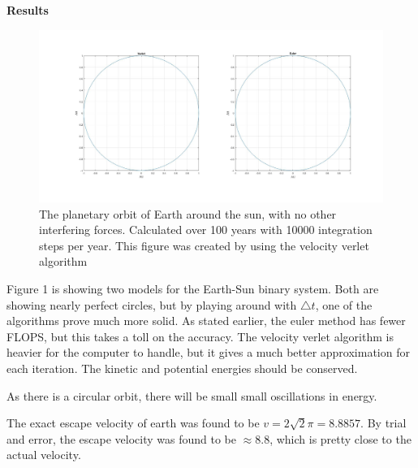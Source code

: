 \documentclass[10pt,a4paper]{article}
\begin{document}
\newpage
{\LARGE\bf
Results
}\\
\begin{figure} [h]  

\centerline{\includegraphics[scale=0.3]{FirstModel.jpg}}
\caption{The planetary orbit of Earth around the sun, with no other interfering forces. Calculated over 100 years with 10000 integration steps per year. This figure was created by using the velocity verlet algorithm}
\end{figure}

\noindent Figure 1 is showing  two models for the Earth-Sun binary system. Both are showing nearly perfect circles, but by playing around with $\bigtriangleup t$, one of the algorithms prove much more solid. As stated earlier, the euler method has fewer FLOPS, but this takes a toll on the accuracy. The velocity verlet algorithm is heavier for the computer to handle, but it gives a much better approximation for each iteration. The kinetic and potential energies should be conserved. 










As there is a circular orbit, there will be small small oscillations in energy. 



\noindent The exact escape velocity of earth was found to be $v=2\sqrt{2}\pi=8.8857$. By trial and error, the escape velocity was found to be $\approx 8.8$, which is pretty close to the actual velocity. 
\end{document}

